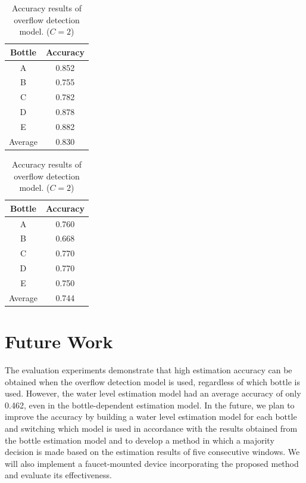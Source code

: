 \documentclass[sigconf,authordraft]{acmart}
\begin{document}
\begin{table}[!t]
  \centering
  \caption{Accuracy results of overflow detection model. ($C=2$)}
  \begin{minipage}[t]{0.45\linewidth}
    \centering
    \begin{tabular}{c|c} \hline\hline
    Bottle & Accuracy \\ \hline
    A & 0.852 \\
    B & 0.755 \\
    C & 0.782 \\
    D & 0.878 \\
    E & 0.882 \\ \hline
    Average & 0.830 \\ \hline
    \end{tabular}
    \label{tab:result_2_dependent}
  \end{minipage}
  \begin{minipage}[t]{0.45\linewidth}
    \centering
    \begin{tabular}{c|c} \hline\hline
    Bottle & Accuracy \\ \hline
    A & 0.760 \\
    B & 0.668 \\
    C & 0.770 \\
    D & 0.770 \\
    E & 0.750 \\ \hline
    Average & 0.744 \\ \hline
    \end{tabular}
    \label{tab:result_2_independent}
  \end{minipage}
  \label{tab:result_2}
\end{table}



\section{Future Work}
\label{sec:future_work}
The evaluation experiments demonstrate that high estimation accuracy can be obtained when the overflow detection model is used, regardless of which bottle is used. However, the water level estimation model had an average accuracy of only 0.462, even in the bottle-dependent estimation model. In the future, we plan to improve the accuracy by building a water level estimation model for each bottle and switching which model is used in accordance with the results obtained from the bottle estimation model and to develop a method in which a majority decision is made based on the estimation results of five consecutive windows. We will also implement a faucet-mounted device incorporating the proposed method and evaluate its effectiveness.
\end{document}
